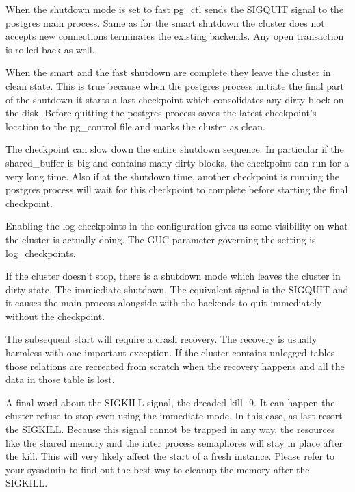 When the shutdown mode is set to fast pg\_ctl sends the SIGQUIT signal to the postgres main process.
Same as for the smart shutdown the cluster does not accepts new connections terminates the existing
backends. Any open transaction is rolled back as well. \newline

When the smart and the fast shutdown are complete they leave the cluster in clean state. This is
true because when the postgres process initiate the final part of the shutdown it starts a
last checkpoint which consolidates any dirty block on the disk. Before quitting the postgres
process saves the latest checkpoint's location to the pg\_control file and marks the
cluster as clean.\newline

The checkpoint can slow down the entire shutdown sequence. In particular if the shared\_buffer is
big and contains many dirty blocks, the checkpoint can run for a very long time. Also if at
the shutdown time, another checkpoint is running the postgres process will wait for this
checkpoint to complete before starting the final checkpoint.\newline

Enabling the log checkpoints in the configuration gives us some visibility on what the cluster is
actually doing. The GUC parameter governing the setting is log\_checkpoints.\newline


If the cluster doesn't stop, there is a shutdown mode which leaves the cluster in dirty state.
The immiediate shutdown. The equivalent signal is the SIGQUIT and it causes the main process
alongside with the backends to quit immediately without the checkpoint.\newline

The subsequent start will require a crash recovery. The recovery is usually harmless with one
important exception. If the cluster contains unlogged tables those relations are recreated from
scratch when the recovery happens and all the data in those table is lost.

A final word about the SIGKILL signal, the dreaded kill -9. It can happen the cluster refuse to
stop even using the immediate mode. In this case, as last resort the SIGKILL. Because this signal
cannot be trapped in any way, the resources like the shared memory and the inter process semaphores
will stay in place after the kill. This will very likely affect the start of a fresh instance.
Please refer to your sysadmin to find out the best way to cleanup the memory after the
SIGKILL.


